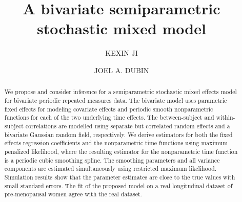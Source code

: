 \documentclass[article,lineno]{biometrika}
\begin{document}





\title{A bivariate semiparametric stochastic  mixed model}

\author{KEXIN JI \and JOEL A. DUBIN}


\maketitle

\begin{abstract}
We propose and consider inference for a semiparametric stochastic mixed effects model for bivariate periodic repeated measures data.  The bivariate model uses parametric fixed effects for modeling covariate effects and periodic smooth nonparametric functions for each of the two underlying time effects. The between-subject and within-subject correlations are modelled using separate but correlated random effects and a bivariate Gaussian random field, respectively. We derive estimators for both the fixed effects regression coefficients and the nonparametric time functions using maximum penalized likelihood, where the resulting estimator for the nonparametric time function is a periodic cubic smoothing spline. The smoothing parameters and all variance components are estimated simultaneously using restricted maximum likelihood.  Simulation results show that the parameter estimates are close to the true values with small standard errors. The fit of the proposed model on a real longitudinal dataset of pre-menopausal women agree with the real dataset.
\end{abstract}
\end{document}
